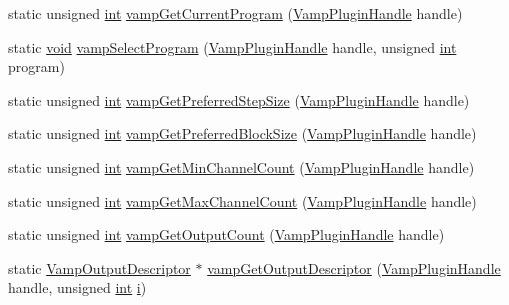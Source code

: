 \begin{DoxyCompactItemize}
\item 
static unsigned \hyperlink{xmltok_8h_a5a0d4a5641ce434f1d23533f2b2e6653}{int} \hyperlink{class_vamp_1_1_plugin_adapter_base_1_1_impl_a62824538d09f38a060bcc593f79ca8a1}{vamp\+Get\+Current\+Program} (\hyperlink{vamp_8h_ad3be2952b1f4ad7d775940a6db75c79b}{Vamp\+Plugin\+Handle} handle)
\item 
static \hyperlink{sound_8c_ae35f5844602719cf66324f4de2a658b3}{void} \hyperlink{class_vamp_1_1_plugin_adapter_base_1_1_impl_a124b1ee65cbb733004ae96f4fa001246}{vamp\+Select\+Program} (\hyperlink{vamp_8h_ad3be2952b1f4ad7d775940a6db75c79b}{Vamp\+Plugin\+Handle} handle, unsigned \hyperlink{xmltok_8h_a5a0d4a5641ce434f1d23533f2b2e6653}{int} program)
\item 
static unsigned \hyperlink{xmltok_8h_a5a0d4a5641ce434f1d23533f2b2e6653}{int} \hyperlink{class_vamp_1_1_plugin_adapter_base_1_1_impl_aa6e7c06690fed8d7af284be34a590b4b}{vamp\+Get\+Preferred\+Step\+Size} (\hyperlink{vamp_8h_ad3be2952b1f4ad7d775940a6db75c79b}{Vamp\+Plugin\+Handle} handle)
\item 
static unsigned \hyperlink{xmltok_8h_a5a0d4a5641ce434f1d23533f2b2e6653}{int} \hyperlink{class_vamp_1_1_plugin_adapter_base_1_1_impl_a46d39ad29bb4c689e21379e1eb387ace}{vamp\+Get\+Preferred\+Block\+Size} (\hyperlink{vamp_8h_ad3be2952b1f4ad7d775940a6db75c79b}{Vamp\+Plugin\+Handle} handle)
\item 
static unsigned \hyperlink{xmltok_8h_a5a0d4a5641ce434f1d23533f2b2e6653}{int} \hyperlink{class_vamp_1_1_plugin_adapter_base_1_1_impl_a9825e946f36f8838ec3d4cb838c00220}{vamp\+Get\+Min\+Channel\+Count} (\hyperlink{vamp_8h_ad3be2952b1f4ad7d775940a6db75c79b}{Vamp\+Plugin\+Handle} handle)
\item 
static unsigned \hyperlink{xmltok_8h_a5a0d4a5641ce434f1d23533f2b2e6653}{int} \hyperlink{class_vamp_1_1_plugin_adapter_base_1_1_impl_a16bfdb3fc7b683a170b01bf92a49dee2}{vamp\+Get\+Max\+Channel\+Count} (\hyperlink{vamp_8h_ad3be2952b1f4ad7d775940a6db75c79b}{Vamp\+Plugin\+Handle} handle)
\item 
static unsigned \hyperlink{xmltok_8h_a5a0d4a5641ce434f1d23533f2b2e6653}{int} \hyperlink{class_vamp_1_1_plugin_adapter_base_1_1_impl_adebb9f604929cde924e783997e9efda3}{vamp\+Get\+Output\+Count} (\hyperlink{vamp_8h_ad3be2952b1f4ad7d775940a6db75c79b}{Vamp\+Plugin\+Handle} handle)
\item 
static \hyperlink{vamp_8h_aa8429dd9c60d65800c58574c2b06bf66}{Vamp\+Output\+Descriptor} $\ast$ \hyperlink{class_vamp_1_1_plugin_adapter_base_1_1_impl_a5118f9af094598b9f8c8a295a5e2290c}{vamp\+Get\+Output\+Descriptor} (\hyperlink{vamp_8h_ad3be2952b1f4ad7d775940a6db75c79b}{Vamp\+Plugin\+Handle} handle, unsigned \hyperlink{xmltok_8h_a5a0d4a5641ce434f1d23533f2b2e6653}{int} \hyperlink{checksum_8c_ab80e330a3bc9e38c1297fe17381e92b4}{i})

\end{DoxyCompactItemize}
